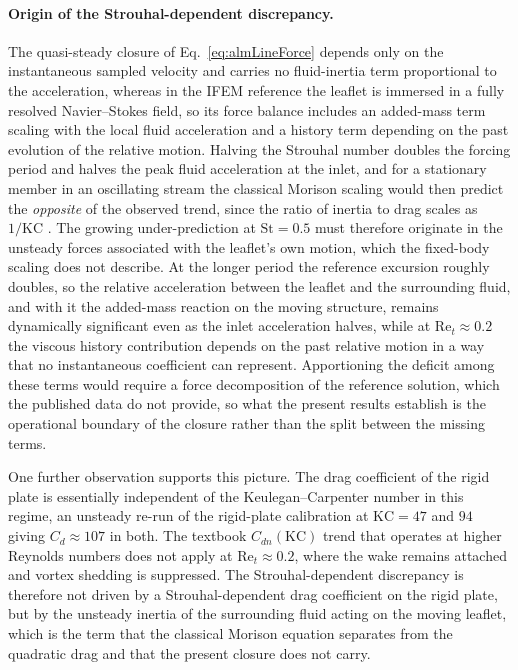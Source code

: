 \paragraph{Origin of the Strouhal-dependent discrepancy.}
The quasi-steady closure of Eq.~\eqref{eq:almLineForce} depends only on the instantaneous sampled velocity and carries no fluid-inertia term proportional to the acceleration, whereas in the IFEM reference the leaflet is immersed in a fully resolved Navier--Stokes field, so its force balance includes an added-mass term scaling with the local fluid acceleration and a history term depending on the past evolution of the relative motion. Halving the Strouhal number doubles the forcing period and halves the peak fluid acceleration at the inlet, and for a stationary member in an oscillating stream the classical Morison scaling would then predict the \emph{opposite} of the observed trend, since the ratio of inertia to drag scales as $1/\mathrm{KC}$ \citep{sarpkaya_mechanics_1981}. The growing under-prediction at $\mathrm{St} = 0.5$ must therefore originate in the unsteady forces associated with the leaflet's own motion, which the fixed-body scaling does not describe. At the longer period the reference excursion roughly doubles, so the relative acceleration between the leaflet and the surrounding fluid, and with it the added-mass reaction on the moving structure, remains dynamically significant even as the inlet acceleration halves, while at $\mathrm{Re}_{t} \approx 0.2$ the viscous history contribution depends on the past relative motion in a way that no instantaneous coefficient can represent. Apportioning the deficit among these terms would require a force decomposition of the reference solution, which the published data do not provide, so what the present results establish is the operational boundary of the closure rather than the split between the missing terms.

\noindent
One further observation supports this picture. The drag coefficient of the rigid plate is essentially independent of the Keulegan--Carpenter number in this regime, an unsteady re-run of the rigid-plate calibration at $\mathrm{KC} = 47$ and $94$ giving $C_{d} \approx 107$ in both. The textbook $C_{dn}(\mathrm{KC})$ trend that operates at higher Reynolds numbers does not apply at $\mathrm{Re}_{t} \approx 0.2$, where the wake remains attached and vortex shedding is suppressed. The Strouhal-dependent discrepancy is therefore not driven by a Strouhal-dependent drag coefficient on the rigid plate, but by the unsteady inertia of the surrounding fluid acting on the moving leaflet, which is the term that the classical Morison equation separates from the quadratic drag and that the present closure does not carry.

